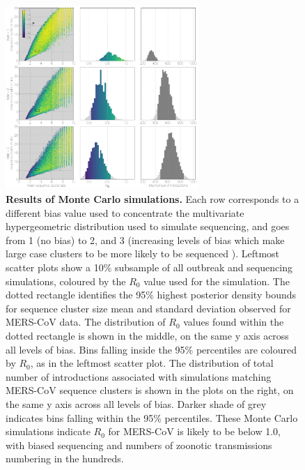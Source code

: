 \documentclass[11pt,oneside,letterpaper]{article}
\def\tbc#1{\textcolor{purple}{[#1]}}
\def\lmc#1{\textcolor{green}{[#1]}}
\begin{document}
\begin{figure}[h]
\centering
	\includegraphics[width=0.65\textwidth]{figures/mers_epi.png}
	\caption{\textbf{Results of Monte Carlo simulations.}
Each row corresponds to a different bias value used to concentrate the multivariate hypergeometric distribution used to simulate sequencing, and goes from 1 (no bias) to 2, and 3 (increasing levels of bias which make large case clusters to be more likely to be sequenced%
).
Leftmost scatter plots show a 10\% subsample of all outbreak and sequencing simulations, coloured by the $R_{0}$ value used for the simulation.
The dotted rectangle identifies the 95\% highest posterior density bounds for sequence cluster size mean and standard deviation observed for MERS-CoV data.
The distribution of $R_{0}$ values found within the dotted rectangle is shown in the middle, on the same y axis across all levels of bias.
Bins falling inside the 95\% percentiles are coloured by $R_{0}$, as in the leftmost scatter plot.
The distribution of total number of introductions associated with simulations matching MERS-CoV sequence clusters is shown in the plots on the right, on the same y axis across all levels of bias.
Darker shade of grey indicates bins falling within the 95\% percentiles.
These Monte Carlo simulations indicate $R_{0}$ for MERS-CoV is likely to be below 1.0, with biased sequencing and numbers of zoonotic transmissions numbering in the hundreds.
	}
	\label{ABC}
\end{figure}
\end{document}

